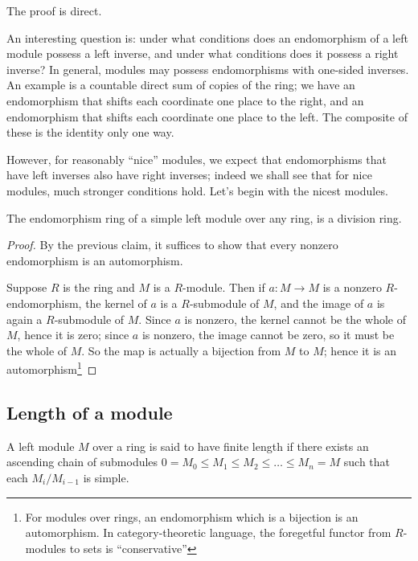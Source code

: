 \documentclass[a4paper]{amsart}
\begin{document}
The proof is direct.

An interesting question is: under what conditions does an endomorphism
of a left module possess a left inverse, and under what conditions
does it possess a right inverse? In general, modules may possess
endomorphisms with one-sided inverses. An example is a countable direct sum
of copies of the ring; we have an endomorphism that shifts each
coordinate one place to the right, and an endomorphism that shifts
each coordinate one place to the left. The composite of these is the
identity only one way.

However, for reasonably ``nice'' modules, we expect that endomorphisms
that have left inverses also have right inverses; indeed we shall see
that for nice modules, much stronger conditions hold. Let's begin with
the nicest modules.


\begin{theorem}
  The endomorphism ring of a simple left module over any ring,
  is a division ring.
\end{theorem}

\begin{proof}
  By the previous claim, it suffices to show that every nonzero
  endomorphism is an automorphism.

  Suppose $R$ is the ring and $M$ is a $R$-module. Then if $a:M \to M$
  is a nonzero $R$-endomorphism, the kernel of $a$ is a $R$-submodule
  of $M$, and the image of $a$ is again a $R$-submodule of $M$. Since
  $a$ is nonzero, the kernel cannot be the whole of $M$, hence it is
  zero; since $a$ is nonzero, the image cannot be zero, so it must be
  the whole of $M$. So the map is actually a bijection from $M$ to
  $M$; hence it is an automorphism\footnote{For modules over rings, an
    endomorphism which is a bijection is an automorphism. In
    category-theoretic language, the foregetful functor from
    $R$-modules to sets is ``conservative''}
\end{proof}

\subsection{Length of a module}

\begin{definer}
  A left module $M$ over a ring is said to have finite length if there
  exists an ascending chain of submodules $0 = M_0 \le M_1 \le M_2 \le
  \ldots \le M_n = M$ such that each $M_i/M_{i-1}$ is simple.
\end{definer}
\end{document}
